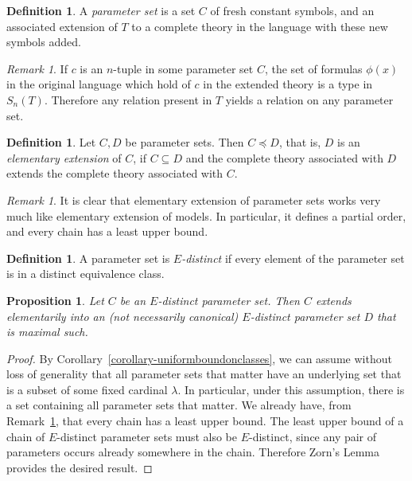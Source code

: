 \documentclass[letterpaper,twoside]{article}
\newtheorem{proposition}[theorem]{Proposition}
\theoremstyle{definition}
\newtheorem{definition}[theorem]{Definition}
\theoremstyle{remark}
\newtheorem{remark}[theorem]{Remark}
\newcommand{\defterm}[1]{\emph{#1}}
\newcommand{\elsubeq}{\preceq}
\begin{document}
\begin{definition}
  A \defterm{parameter set} is a set \(C\) of fresh constant symbols,
  and an associated extension of \(T\) to a complete theory in the
  language with these new symbols added.
\end{definition}

\begin{remark}
  If \(c\) is an \(n\)-tuple in some parameter set \(C\), the set of
  formulas \(\phi(x)\) in the original language which hold of \(c\) in
  the extended theory is a type in \(S_n(T)\).  Therefore any relation
  present in \(T\) yields a relation on any parameter set.
\end{remark}

\begin{definition}
  Let \(C, D\) be parameter sets.  Then \(C \elsubeq D\), that is,
  \(D\) is an \defterm{elementary extension} of \(C\), if \(C
  \subseteq D\) and the complete theory associated with \(D\) extends
  the complete theory associated with \(C\).
\end{definition}

\begin{remark}\label{remark-elsubisordinary}
  It is clear that elementary extension of parameter sets works very
  much like elementary extension of models.  In particular, it defines
  a partial order, and every chain has a least upper bound.
\end{remark}

\begin{definition}
  A parameter set is \defterm{\(E\)-distinct} if every element of the
  parameter set is in a distinct equivalence class.
\end{definition}

\begin{proposition}\label{proposition-maximalsexist}
  Let \(C\) be an \(E\)-distinct parameter set.  Then \(C\) extends
  elementarily into an (not necessarily canonical) \(E\)-distinct
  parameter set \(D\) that is maximal such.
\end{proposition}
\begin{proof}
  By Corollary~\ref{corollary-uniformboundonclasses}, we can assume
  without loss of generality that all parameter sets that matter have
  an underlying set that is a subset of some fixed cardinal
  \(\lambda\).  In particular, under this assumption, there is a set
  containing all parameter sets that matter.  We already have, from
  Remark~\ref{remark-elsubisordinary}, that every chain has a least
  upper bound.  The least upper bound of a chain of \(E\)-distinct
  parameter sets must also be \(E\)-distinct, since any pair of
  parameters occurs already somewhere in the chain.  Therefore Zorn's
  Lemma provides the desired result.
\end{proof}
\end{document}
